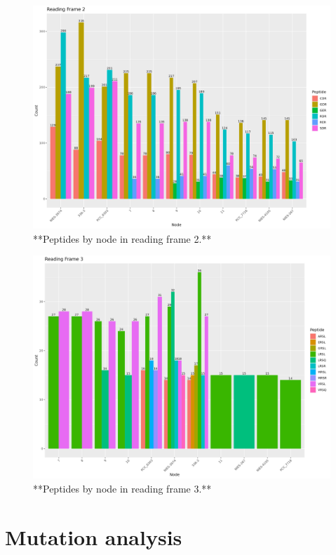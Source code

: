 \documentclass[
]{book}
\begin{document}
\begin{figure}
\includegraphics[width=1\linewidth]{figures/Peptides_RF2} \caption{**Peptides by node in reading frame 2.**}\label{fig:FIG8x}
\end{figure}

\begin{figure}
\includegraphics[width=1\linewidth]{figures/Peptides_RF3} \caption{**Peptides by node in reading frame 3.**}\label{fig:FIG9x}
\end{figure}

\hypertarget{mutation-analysis-1}{%
\section{Mutation analysis}\label{mutation-analysis-1}}
\end{document}
